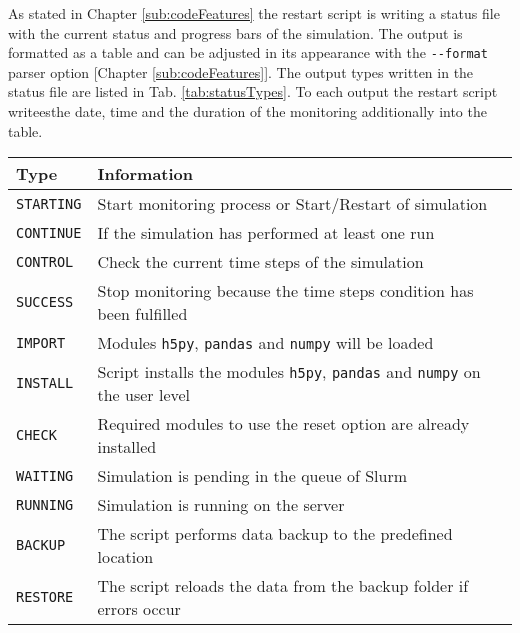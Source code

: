 As stated in Chapter \ref{sub:codeFeatures} the restart script is writing a status file with the current status and progress bars of the simulation. The output is formatted as a table and can be adjusted in its appearance with the \texttt{-\/-format} parser option [Chapter \ref{sub:codeFeatures}]. The output types written in the status file are listed in Tab. \ref{tab:statusTypes}. To each output the restart script writeesthe date, time and the duration of the monitoring additionally into the table. 
\begin{center}
    \captionsetup{type=table}
    \begin{tabular}{l | l}
        Type              & Information                                                                                     \\\hline
        \texttt{STARTING} & Start monitoring process or Start/Restart of simulation                                         \\
        \texttt{CONTINUE} & If the simulation has performed at least one run                                                \\\hline
        \texttt{CONTROL}  & Check the current time steps of the simulation                                                  \\
        \texttt{SUCCESS}  & Stop monitoring because the time steps condition has been fulfilled                             \\\hline
        \texttt{IMPORT}   & Modules \texttt{h5py}, \texttt{pandas} and \texttt{numpy} will be loaded                        \\
        \texttt{INSTALL}  & Script installs the modules \texttt{h5py}, \texttt{pandas} and \texttt{numpy} on the user level \\
        \texttt{CHECK}    & Required modules to use the reset option are already installed                                  \\\hline
        \texttt{WAITING}  & Simulation is pending in the queue of Slurm                                                     \\
        \texttt{RUNNING}  & Simulation is running on the server                                                             \\\hline
        \texttt{BACKUP}   & The script performs data backup to the predefined location                                      \\
        \texttt{RESTORE}  & The script reloads the data from the backup folder if errors occur                              \\

\end{tabular}
\end{center}
